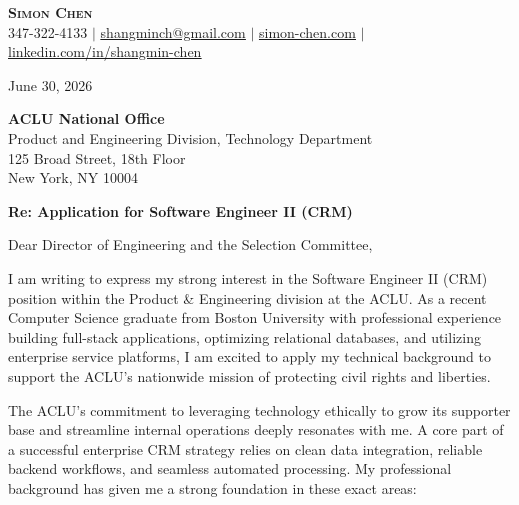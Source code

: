 \documentclass[letterpaper,11pt]{article}
\begin{document}
\begin{center}
    \textbf{\Huge \scshape Simon Chen} \\ \vspace{1pt}
    \small 347-322-4133 $|$ \href{mailto:shangminch@gmail.com}{\underline{shangminch@gmail.com}} $|$ \href{https://simon-chen.com}{\underline{simon-chen.com}} $|$ \href{https://linkedin.com/in/shangmin-chen}{\underline{linkedin.com/in/shangmin-chen}}
\end{center}

\vspace{10pt}

June 30, 2026

\vspace{8pt}
\textbf{ACLU National Office} \\
Product and Engineering Division, Technology Department \\
125 Broad Street, 18th Floor \\
New York, NY 10004

\vspace{8pt}
\textbf{Re: Application for Software Engineer II (CRM)}

\vspace{8pt}
Dear Director of Engineering and the Selection Committee,

I am writing to express my strong interest in the Software Engineer II (CRM) position within the Product \& Engineering division at the ACLU. As a recent Computer Science graduate from Boston University with professional experience building full-stack applications, optimizing relational databases, and utilizing enterprise service platforms, I am excited to apply my technical background to support the ACLU’s nationwide mission of protecting civil rights and liberties.

The ACLU’s commitment to leveraging technology ethically to grow its supporter base and streamline internal operations deeply resonates with me. A core part of a successful enterprise CRM strategy relies on clean data integration, reliable backend workflows, and seamless automated processing. My professional background has given me a strong foundation in these exact areas:
\end{document}

